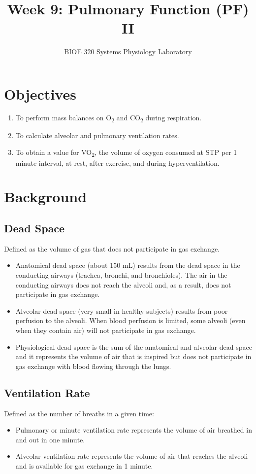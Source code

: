 \documentclass{article}
\title{Week 9: Pulmonary Function (PF) II}
\author{BIOE 320 Systems Physiology Laboratory}
\date{}
\begin{document}
\large
\maketitle

\section*{Objectives}
\begin{enumerate}
	\item To perform mass balances on O\textsubscript{2} and CO\textsubscript{2} during respiration.
	\item To calculate alveolar and pulmonary ventilation rates.
	\item To obtain a value for VO\textsubscript{2}, the volume of oxygen consumed at STP per 1 minute interval, at rest, after exercise, and during hyperventilation.
\end{enumerate}

\section*{Background}
\subsection*{Dead Space}
Defined as the volume of gas that does not participate in gas exchange.
\begin{itemize}
	\item Anatomical dead space (about 150 mL) results from the dead space in the conducting airways (trachea, bronchi, and bronchioles). The air in the conducting airways does not reach the alveoli and, as a result, does not participate in gas exchange.
	\item Alveolar dead space (very small in healthy subjects) results from poor perfusion to the alveoli. When blood perfusion is limited, some alveoli (even when they contain air) will not participate in gas exchange.
	\item Physiological dead space is the sum of the anatomical and alveolar dead space and it represents the volume of air that is inspired but does not participate in gas exchange with blood flowing through the lungs.
\end{itemize}

\subsection*{Ventilation Rate}
Defined as the number of breaths in a given time:
\begin{itemize}
	\item Pulmonary or minute ventilation rate represents the volume of air breathed in and out in one minute.
	\item Alveolar ventilation rate represents the volume of air that reaches the alveoli and is available for gas exchange in 1 minute.
\end{itemize}
\end{document}
